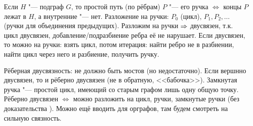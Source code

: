 	Если $H$ "--- подграф $G$, то простой путь (по рёбрам) $P$ "--- его ручка $\iff$ концы $P$ лежат в $H$, а внутренние "--- нет.
	Разложение на ручки: $P_0$ (цикл), $P_1, P_2, \dots$ (ручки для объединения предыдущих).
	Разложим на ручки $\Rightarrow$ двусвязен, т.к. цикл двусвязен, добавление/подразбиение ребра её не нарушает.
	Если двусвязен, то можно на ручки: взять цикл, потом итерация: найти ребро не в разбиении, найти цикл через него и разбиение, получить ручку.

	Рёберная двусвязность: не должно быть мостов (но недостаточно).
	Если вершнно двусвязен, то и рёберно двусвязен (не в обратную, <<бабочка>>).
	Замкнутая ручка "--- простой цикл, имеющий со старым графом лишь одну общую точку.
	Рёберно двусвязен $\iff$ можно разложить на цикл, ручки, замкнутые ручки (без доказательства \TODO).
	Можно ещё вводить для орграфов, там будем смотреть на сильную связность.
